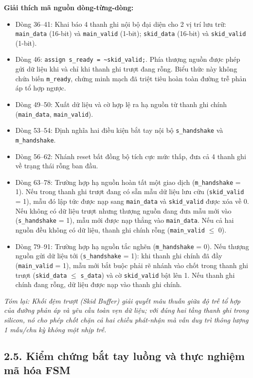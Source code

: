 \textbf{Giải thích mã nguồn dòng-từng-dòng:}
\begin{itemize}[leftmargin=1.5em, itemsep=2pt]
    \item Dòng 36--41: Khai báo 4 thanh ghi nội bộ đại diện cho 2 vị trí lưu trữ: \texttt{main\_data} (16-bit) và \texttt{main\_valid} (1-bit); \texttt{skid\_data} (16-bit) và \texttt{skid\_valid} (1-bit).
    \item Dòng 46: \texttt{assign s\_ready = \~{}skid\_valid;}. Phía thượng nguồn được phép gửi dữ liệu khi và chỉ khi thanh ghi trượt đang rỗng. Biểu thức này không chứa biến \texttt{m\_ready}, chứng minh mạch đã triệt tiêu hoàn toàn đường trễ phản áp tổ hợp ngược.
    \item Dòng 49--50: Xuất dữ liệu và cờ hợp lệ ra hạ nguồn từ thanh ghi chính (\texttt{main\_data}, \texttt{main\_valid}).
    \item Dòng 53--54: Định nghĩa hai điều kiện bắt tay nội bộ \texttt{s\_handshake} và \texttt{m\_handshake}.
    \item Dòng 56--62: Nhánh reset bất đồng bộ tích cực mức thấp, đưa cả 4 thanh ghi về trạng thái rỗng ban đầu.
    \item Dòng 63--78: Trường hợp hạ nguồn hoàn tất một giao dịch (\texttt{m\_handshake} = 1). Nếu trong thanh ghi trượt đang có sẵn mẫu dữ liệu lưu cữu (\texttt{skid\_valid} = 1), mẫu đó lập tức được nạp sang \texttt{main\_data} và \texttt{skid\_valid} được xóa về 0. Nếu không có dữ liệu trượt nhưng thượng nguồn đang đưa mẫu mới vào (\texttt{s\_handshake} = 1), mẫu mới được nạp thẳng vào \texttt{main\_data}. Nếu cả hai nguồn đều không có dữ liệu, thanh ghi chính rỗng (\texttt{main\_valid} $\le$ 0).
    \item Dòng 79--91: Trường hợp hạ nguồn tắc nghẽn (\texttt{m\_handshake} = 0). Nếu thượng nguồn gửi dữ liệu tới (\texttt{s\_handshake} = 1): khi thanh ghi chính đã đầy (\texttt{main\_valid} = 1), mẫu mới bắt buộc phải rẽ nhánh vào chốt trong thanh ghi trượt (\texttt{skid\_data} $\le$ \texttt{s\_data}) và cờ \texttt{skid\_valid} bật lên 1. Nếu thanh ghi chính đang rỗng, dữ liệu được nạp vào thanh ghi chính.
\end{itemize}

\textit{Tóm lại: Khối đệm trượt (Skid Buffer) giải quyết mâu thuẫn giữa độ trễ tổ hợp của đường phản áp và yêu cầu toàn vẹn dữ liệu; với đúng hai tầng thanh ghi trong silicon, nó cho phép chốt chặn cả hai chiều phát-nhận mà vẫn duy trì thông lượng 1 mẫu/chu kỳ không một nhịp trễ.}

\subsection*{2.5. Kiểm chứng bắt tay luồng và thực nghiệm mã hóa FSM}

